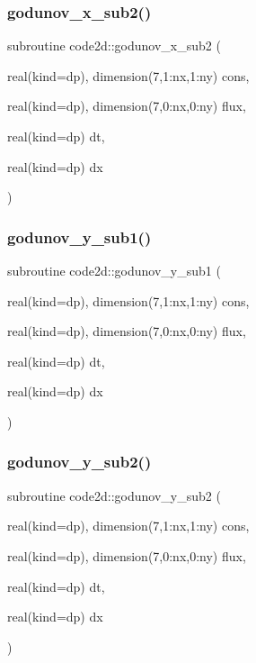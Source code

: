 \mbox{\label{main2Dv1_8f90_a95998c355563e1e58114aea99de5433b}} 
\subsubsection{\texorpdfstring{godunov\+\_\+x\+\_\+sub2()}{godunov\_x\_sub2()}}
{\footnotesize\ttfamily subroutine code2d\+::godunov\+\_\+x\+\_\+sub2 (\begin{DoxyParamCaption}\item[{real(kind=dp), dimension(7,1\+:nx,1\+:ny)}]{cons,  }\item[{real(kind=dp), dimension(7,0\+:nx,0\+:ny)}]{flux,  }\item[{real(kind=dp)}]{dt,  }\item[{real(kind=dp)}]{dx }\end{DoxyParamCaption})}

\mbox{\label{main2Dv1_8f90_a99b7b2764471880074ec2cb4448c3232}} 
\subsubsection{\texorpdfstring{godunov\+\_\+y\+\_\+sub1()}{godunov\_y\_sub1()}}
{\footnotesize\ttfamily subroutine code2d\+::godunov\+\_\+y\+\_\+sub1 (\begin{DoxyParamCaption}\item[{real(kind=dp), dimension(7,1\+:nx,1\+:ny)}]{cons,  }\item[{real(kind=dp), dimension(7,0\+:nx,0\+:ny)}]{flux,  }\item[{real(kind=dp)}]{dt,  }\item[{real(kind=dp)}]{dx }\end{DoxyParamCaption})}

\mbox{\label{main2Dv1_8f90_af2bc178b3e046a285b7e624ecb7246b8}} 
\subsubsection{\texorpdfstring{godunov\+\_\+y\+\_\+sub2()}{godunov\_y\_sub2()}}
{\footnotesize\ttfamily subroutine code2d\+::godunov\+\_\+y\+\_\+sub2 (\begin{DoxyParamCaption}\item[{real(kind=dp), dimension(7,1\+:nx,1\+:ny)}]{cons,  }\item[{real(kind=dp), dimension(7,0\+:nx,0\+:ny)}]{flux,  }\item[{real(kind=dp)}]{dt,  }\item[{real(kind=dp)}]{dx }\end{DoxyParamCaption})}

